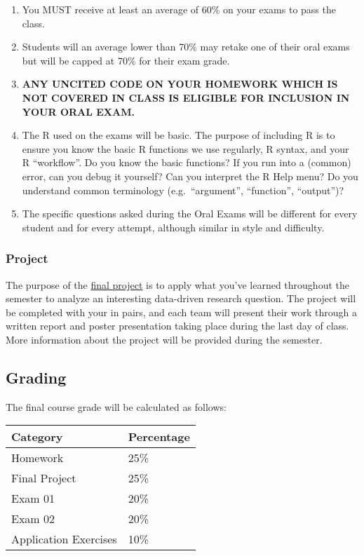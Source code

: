 \documentclass[
  letterpaper,
  DIV=11,
  numbers=noendperiod]{scrartcl}
\providecommand{\tightlist}{%
  \setlength{\itemsep}{0pt}\setlength{\parskip}{0pt}}
\begin{document}
\begin{enumerate}
\def\labelenumi{\arabic{enumi}.}
\tightlist
\item
  You MUST receive at least an average of 60\% on your exams to pass the
  class.
\item
  Students will an average lower than 70\% may retake one of their oral
  exams but will be capped at 70\% for their exam grade.
\item
  \textbf{ANY UNCITED CODE ON YOUR HOMEWORK WHICH IS NOT COVERED IN
  CLASS IS ELIGIBLE FOR INCLUSION IN YOUR ORAL EXAM.}
\item
  The R used on the exams will be basic. The purpose of including R is
  to ensure you know the basic R functions we use regularly, R syntax,
  and your R ``workflow''. Do you know the basic functions? If you run
  into a (common) error, can you debug it yourself? Can you interpret
  the R Help menu? Do you understand common terminology
  (e.g.~``argument'', ``function'', ``output'')?
\item
  The specific questions asked during the Oral Exams will be different
  for every student and for every attempt, although similar in style and
  difficulty.
\end{enumerate}

\subsubsection{Project}\label{project}

The purpose of the \href{./project/project-instructions.qmd}{final
project} is to apply what you've learned throughout the semester to
analyze an interesting data-driven research question. The project will
be completed with your in pairs, and each team will present their work
through a written report and poster presentation taking place during the
last day of class. More information about the project will be provided
during the semester.

\subsection{Grading}\label{grading}

The final course grade will be calculated as follows:

\begin{longtable}[]{@{}ll@{}}
\toprule\noalign{}
Category & Percentage \\
\midrule\noalign{}
\endhead
\bottomrule\noalign{}
\endlastfoot
Homework & 25\% \\
Final Project & 25\% \\
Exam 01 & 20\% \\
Exam 02 & 20\% \\
Application Exercises & 10\% \\
\end{longtable}
\end{document}
